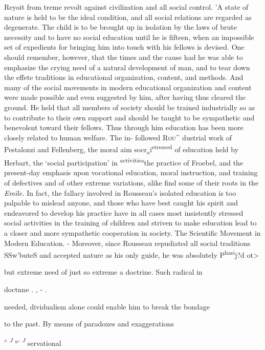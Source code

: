 \documentclass[]{book}
\begin{document}
Reyoit from treme revolt against civilization and all social control. 'A state of nature is held to be the ideal condition, and all social relations are regarded as degenerate. The child is to be brought up in isolation by the laws of brute necessity and to have no social education until he is fifteen, when an impossible set of expedients for bringing him into touch with his fellows is devised. One should remember, however, that the times and the cause had\protect\hypertarget{ch19.xmlux5cux23para.276.1.0.box.151.236.1266.1392.q.60}{}{ he was able to emphasize the crying need of a natural development of man, and to tear down the effete traditions in educational organization, content, and methods. And many of the social movements in modern educational organization and content were made possible and even suggested by him, after having thus cleared the ground. He held that all members of society should be trained industrially so as to contribute to their own support and should be taught to be sympathetic and benevolent toward their fellows. Thus through him education has been more closely related to human welfare. The in- followed \textsc{Rou\^{} }dustrial work of Pestalozzi and Fellenberg, the moral aim socr\textsubscript{a}i\textsuperscript{stressed} of education held by Herbart, the `social participation' in \textsuperscript{activitiea}the practice of Froebel, and the present-day emphasis upon vocational education, moral instruction, and training of defectives and of other extreme variations, alike find some of their roots in the \emph{Emile.} In fact, the fallacy involved in Rousseau's isolated education is too palpable to mislead anyone, and those who have best caught his spirit and endeavored to develop his practice have in all cases most insistently stressed social activities in the training of children and striven to make education lead to a closer and more sympathetic cooperation in society. The Scientific Movement in Modern Education. - Moreover, since Rousseau repudiated all social traditions SSw'buteS and accepted nature as his only guide, he was absolutely P\textsuperscript{hasi}j?d ot\textgreater{}}

but extreme need of just so extreme a doctrine. Such radical in

doctnne . , - .

needed, dividualism alone could enable him to break the bondage

to the past. By means of paradoxes and exaggerations

\emph{\textsuperscript{c} \textsuperscript{J}} °' \emph{\textsuperscript{J}} servational
\end{document}
